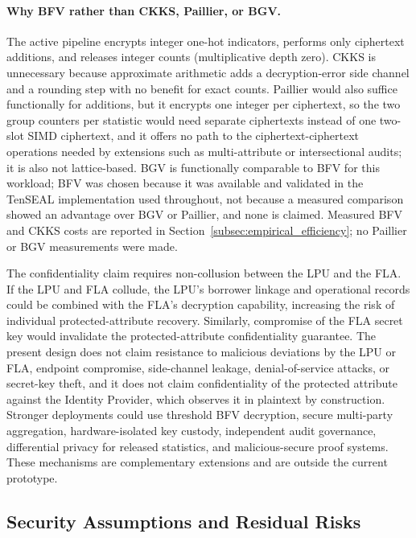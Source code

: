 \documentclass[a4paper,fleqn]{cas-dc}
\begin{document}
{\paragraph{Why BFV rather than CKKS, Paillier, or BGV.} The active pipeline encrypts integer one-hot indicators, performs only ciphertext additions, and releases integer counts (multiplicative depth zero). CKKS is unnecessary because approximate arithmetic adds a decryption-error side channel and a rounding step with no benefit for exact counts. Paillier would also suffice functionally for additions, but it encrypts one integer per ciphertext, so the two group counters per statistic would need separate ciphertexts instead of one two-slot SIMD ciphertext, and it offers no path to the ciphertext-ciphertext operations needed by extensions such as multi-attribute or intersectional audits; it is also not lattice-based. BGV is functionally comparable to BFV for this workload; BFV was chosen because it was available and validated in the TenSEAL implementation used throughout, not because a measured comparison showed an advantage over BGV or Paillier, and none is claimed. Measured BFV and CKKS costs are reported in Section~\ref{subsec:empirical_efficiency}; no Paillier or BGV measurements were made.

The confidentiality claim requires non-collusion between the LPU and the FLA. If the LPU and FLA collude, the LPU's borrower linkage and operational records could be combined with the FLA's decryption capability, increasing the risk of individual protected-attribute recovery. Similarly, compromise of the FLA secret key would invalidate the protected-attribute confidentiality guarantee. The present design does not claim resistance to malicious deviations by the LPU or FLA, endpoint compromise, side-channel leakage, denial-of-service attacks, or secret-key theft, and it does not claim confidentiality of the protected attribute against the Identity Provider, which observes it in plaintext by construction. Stronger deployments could use threshold BFV decryption, secure multi-party aggregation, hardware-isolated key custody, independent audit governance, differential privacy for released statistics, and malicious-secure proof systems. These mechanisms are complementary extensions and are outside the current prototype.



\subsection{Security Assumptions and Residual Risks}

}
\end{document}
